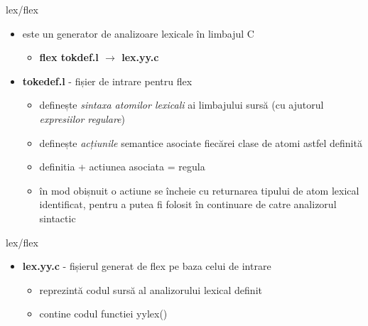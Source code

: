 \documentclass[pdf]{beamer}
\begin{document}
\begin{frame}{lex/flex}
\begin{itemize}
\item
este un generator de analizoare lexicale în limbajul C
	
	\begin{itemize}
	\item
	\textbf{flex  tokdef.l  $\rightarrow$  lex.yy.c}
	\end{itemize}
	
\item
\textbf{tokedef.l} - fișier de intrare pentru flex

\begin{itemize}
\item
definește \textit{sintaxa atomilor lexicali} ai limbajului sursă (cu ajutorul \textit{expresiilor regulare})
\newline

\item
definește \textit{acțiunile} semantice asociate fiecărei clase de atomi astfel definită
\newline

\item
definitia + actiunea asociata = regula
\newline

\item
în mod obișnuit o actiune se încheie cu returnarea tipului de atom lexical identificat, pentru a putea fi folosit în continuare de catre analizorul sintactic
\end{itemize}

\end{itemize}
\end{frame}



\begin{frame}{lex/flex}
\begin{itemize}
\item
\textbf{lex.yy.c} - fișierul generat de flex pe baza celui de intrare

\begin{itemize}
\item
reprezintă codul sursă al analizorului lexical definit
\newline

\item
contine codul functiei yylex() 
\end{itemize}

\end{itemize}
\end{frame}
\end{document}

